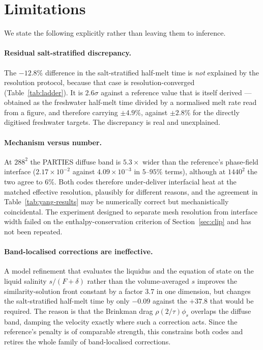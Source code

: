 \documentclass[review,12pt]{elsarticle}
\begin{document}
\section{Limitations}
\label{sec:limitations}

We state the following explicitly rather than leaving them to inference.

\paragraph{Residual salt-stratified discrepancy.} The $-12.8\%$ difference in
the salt-stratified half-melt time is \emph{not} explained by the resolution
protocol, because that case is resolution-converged
(Table~\ref{tab:ladder}). It is $2.6\sigma$ against a reference value that is
itself derived --- obtained as the freshwater half-melt time divided by a
normalised melt rate read from a figure, and therefore carrying $\pm4.9\%$,
against $\pm2.8\%$ for the directly digitised freshwater targets. The
discrepancy is real and unexplained.

\paragraph{Mechanism versus number.} At $288^2$ the PARTIES diffuse band is
$5.3\times$ wider than the reference's phase-field interface ($2.17\times10^{-2}$
against $4.09\times10^{-3}$ in $5$--$95\%$ terms), although at $1440^2$ the two
agree to $6\%$. Both codes therefore under-deliver interfacial heat at the
matched effective resolution, plausibly for different reasons, and the agreement
in Table~\ref{tab:yang-results} may be numerically correct but mechanistically
coincidental. The experiment designed to separate mesh resolution from interface
width failed on the enthalpy-conservation criterion of Section~\ref{sec:clip} and
has not been repeated.

\paragraph{Band-localised corrections are ineffective.} A model refinement that
evaluates the liquidus and the equation of state on the liquid salinity
$s/(F+\delta)$ rather than the volume-averaged $s$ improves the similarity-solution
front constant by a factor $3.7$ in one dimension, but changes the
salt-stratified half-melt time by only $-0.09$ against the $+37.8$ that would be
required. The reason is that the Brinkman drag $\rho(2/\tau)\phi_s$ overlaps the
diffuse band, damping the velocity exactly where such a correction acts. Since
the reference's penalty is of comparable strength, this constrains both codes and
retires the whole family of band-localised corrections.
\end{document}

